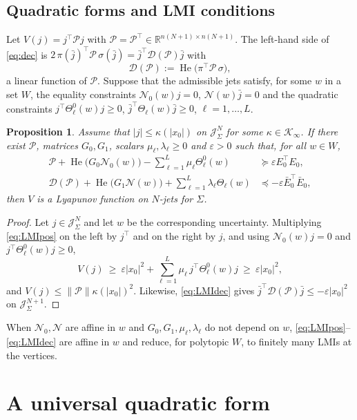 \documentclass[preprint,12pt,authoryear]{elsarticle}
\newtheorem{proposition}[theorem]{Proposition}
\theoremstyle{definition}
\theoremstyle{remark}
\newcommand{\R}{\mathbb{R}}
\newcommand{\Jet}{\mathcal{J}}
\newcommand{\tr}{^{\top}}
\newcommand{\PP}{\mathcal{P}}
\newcommand{\DD}{\mathcal{D}}
\newcommand{\NN}{\mathcal{N}}
\DeclareMathOperator{\He}{He}
\begin{document}
\subsection{Quadratic forms and LMI conditions}
Let $V(j)=j\tr\PP j$ with $\PP=\PP\tr\in\R^{n(N+1)\times n(N+1)}$. The left-hand side of \eqref{eq:dec} is $2\,\pi(\bar j)\tr\PP\,\sigma(\bar j)=\bar j\tr\DD(\PP)\bar j$ with
\begin{equation}\label{eq:D}
\DD(\PP):=\He\big(\pi\tr\PP\,\sigma\big),
\end{equation}
a linear function of $\PP$. Suppose that the admissible jets satisfy, for some $w$ in a set $W$, the equality constraints $\NN_0(w)j=0$, $\NN(w)\bar j=0$ and the quadratic constraints $j\tr\Theta^0_\ell(w)j\ge0$, $\bar j\tr\Theta_\ell(w)\bar j\ge0$, $\ell=1,\dots,L$.
\begin{proposition}\label{prop:LMI}
Assume that $|j|\le\kappa(|x_0|)$ on $\Jet^N_\Sigma$ for some $\kappa\in\mathcal K_\infty$. If there exist $\PP$, matrices $G_0,G_1$, scalars $\mu_\ell,\lambda_\ell\ge0$ and $\varepsilon>0$ such that, for all $w\in W$,
\begin{align}
\PP+\He\big(G_0\NN_0(w)\big)-\sum_{\ell=1}^L\mu_\ell\Theta^0_\ell(w)&\succeq\varepsilon E_0\tr E_0,\label{eq:LMIpos}\\
\DD(\PP)+\He\big(G_1\NN(w)\big)+\sum_{\ell=1}^L\lambda_\ell\Theta_\ell(w)&\preceq-\varepsilon \bar E_0\tr\bar E_0,\label{eq:LMIdec}
\end{align}
then $V$ is a Lyapunov function on $N$-jets for $\Sigma$.
\end{proposition}
\begin{proof}
Let $j\in\Jet^N_\Sigma$ and let $w$ be the corresponding uncertainty. Multiplying \eqref{eq:LMIpos} on the left by $j\tr$ and on the right by $j$, and using $\NN_0(w)j=0$ and $j\tr\Theta^0_\ell(w)j\ge0$,
\begin{equation}
V(j)\ \ge\ \varepsilon|x_0|^2+\sum_{\ell=1}^L\mu_\ell\,j\tr\Theta^0_\ell(w)j\ \ge\ \varepsilon|x_0|^2 ,
\end{equation}
and $V(j)\le\|\PP\|\kappa(|x_0|)^2$. Likewise, \eqref{eq:LMIdec} gives $\bar j\tr\DD(\PP)\bar j\le-\varepsilon|x_0|^2$ on $\Jet^{N+1}_\Sigma$.
\end{proof}
When $\NN_0,\NN$ are affine in $w$ and $G_0,G_1,\mu_\ell,\lambda_\ell$ do not depend on $w$, \eqref{eq:LMIpos}--\eqref{eq:LMIdec} are affine in $w$ and reduce, for polytopic $W$, to finitely many LMIs at the vertices.

\section{A universal quadratic form}\label{sec:universal}
\end{document}

